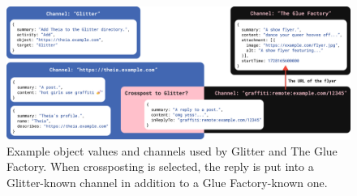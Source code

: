 \begin{figure}[h]
    \centering
    \includegraphics[width=\textwidth]{figures/schemas-and-channels.png}
    \caption{Example object values and channels used by Glitter and The Glue Factory.
    When crossposting is selected, the reply is put into a Glitter-known channel in addition to a Glue Factory-known one.}
    \label{case-studies:fig:schemas-and-channels}
\end{figure}





